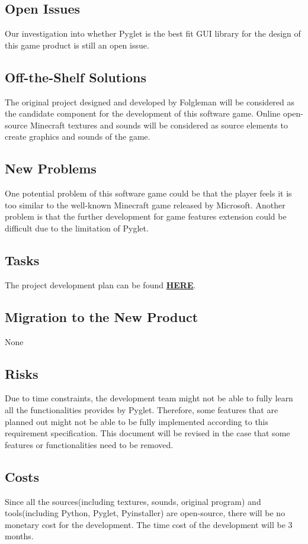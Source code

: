 \documentclass[12pt, titlepage]{article}
\begin{document}
\subsection{Open Issues}
Our investigation into whether Pyglet is the best fit GUI library for the design of this game product is still an open issue.
\subsection{Off-the-Shelf Solutions}
The original project designed and developed by Folgleman \cite{mine} will be considered as the candidate component for the development of this software game. Online open-source Minecraft textures and sounds will be considered as source elements to create graphics and sounds of the game.
\subsection{New Problems}
One potential problem of this software game could be that the player feels it is too similar to the well-known Minecraft game released by Microsoft. Another problem is that the further development for game features extension could be difficult due to the limitation of Pyglet.
\subsection{Tasks}
The project development plan can be found \href{https://gitlab.cas.mcmaster.ca/wangs132/minecraft/blob/master/Doc/DevelopmentPlan/DevelopmentPlan.pdf}{\textbf{HERE}}.
\subsection{Migration to the New Product}
None
\subsection{Risks}
Due to time constraints, the development team might not be able to fully learn all the functionalities provides by Pyglet. Therefore, some features that are planned out might not be able to be fully implemented according to this requirement specification. This document will be revised in the case that some features or functionalities need to be removed.
\subsection{Costs}
Since all the sources(including textures, sounds, original program) and tools(including Python, Pyglet, Pyinstaller) are open-source, there will be no monetary cost for the development. The time cost of the development will be 3 months.
\end{document}

